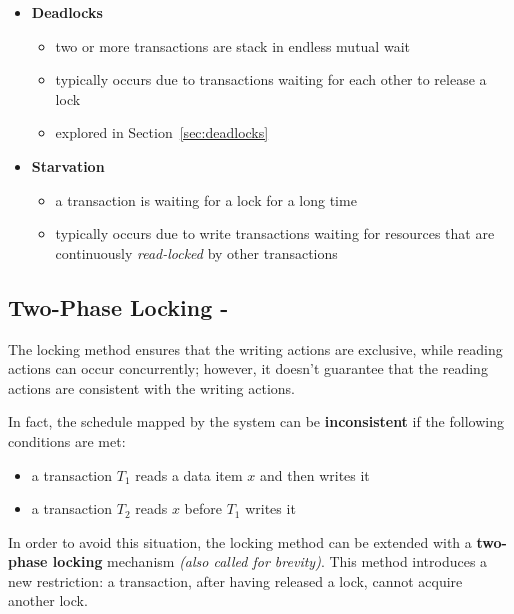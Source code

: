 \documentclass[english]{article}
\begin{document}
\begin{itemize}
  \item \textbf{Deadlocks}
        \begin{itemize}
          \item two or more transactions are stack in endless mutual wait
          \item typically occurs due to transactions waiting for each other to release a lock
          \item explored in Section~\ref{sec:deadlocks}
        \end{itemize}
  \item \textbf{Starvation}
        \begin{itemize}
          \item a transaction is waiting for a lock for a long time
          \item typically occurs due to write transactions waiting for resources that are continuously \textit{read-locked} by other transactions
        \end{itemize}
\end{itemize}

\subsection{Two-Phase Locking - \TPL}

The locking method ensures that the writing actions are exclusive, while reading actions can occur concurrently;
however, it doesn't guarantee that the reading actions are consistent with the writing actions.

In fact, the schedule mapped by the \CC system can be \textbf{inconsistent} if the following conditions are met:

\begin{itemize}
  \item a transaction \(T_1\) reads a data item \(x\) and then writes it
  \item a transaction \(T_2\) reads \(x\) before \(T_1\) writes it
\end{itemize}

In order to avoid this situation, the locking method can be extended with a \textbf{two-phase locking} mechanism \textit{(also called
  \TPL for brevity)}.
This method introduces a new restriction: a transaction, after having released a lock, cannot acquire another lock.
\end{document}
